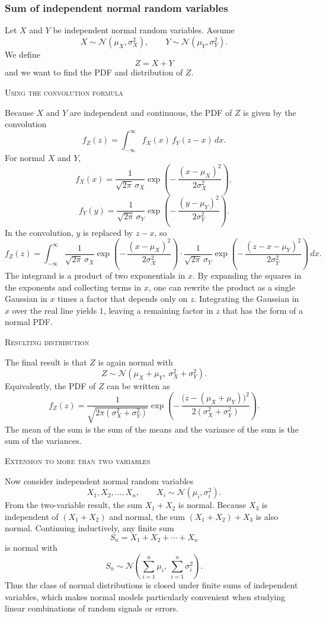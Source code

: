 \subsubsection{Sum of independent normal random variables}

Let \(X\) and \(Y\) be independent normal random variables.  
Assume
\[
X \sim \mathcal{N}(\mu_X,\sigma_X^{2}),
\qquad
Y \sim \mathcal{N}(\mu_Y,\sigma_Y^{2}).
\]
We define
\[
Z = X + Y
\]
and we want to find the PDF and distribution of \(Z\).

\bigskip
\textsc{Using the convolution formula}

Because \(X\) and \(Y\) are independent and continuous, the PDF of \(Z\) is given by the convolution
\[
f_Z(z)
=
\int_{-\infty}^{\infty} f_X(x)\,f_Y(z-x)\,dx.
\]
For normal \(X\) and \(Y\),
\[
f_X(x)
=
\frac{1}{\sqrt{2\pi}\,\sigma_X}
\exp\!\left(-\,\frac{(x-\mu_X)^{2}}{2\sigma_X^{2}}\right),
\]
\[
f_Y(y)
=
\frac{1}{\sqrt{2\pi}\,\sigma_Y}
\exp\!\left(-\,\frac{(y-\mu_Y)^{2}}{2\sigma_Y^{2}}\right).
\]
In the convolution, \(y\) is replaced by \(z-x\), so
\[
f_Z(z)
=
\int_{-\infty}^{\infty}
\frac{1}{\sqrt{2\pi}\,\sigma_X}
\exp\!\left(-\,\frac{(x-\mu_X)^{2}}{2\sigma_X^{2}}\right)
\cdot
\frac{1}{\sqrt{2\pi}\,\sigma_Y}
\exp\!\left(-\,\frac{(z-x-\mu_Y)^{2}}{2\sigma_Y^{2}}\right)
\,dx.
\]
The integrand is a product of two exponentials in \(x\).  
By expanding the squares in the exponents and collecting terms in \(x\), one can rewrite the product as a single Gaussian in \(x\) times a factor that depends only on \(z\).  
Integrating the Gaussian in \(x\) over the real line yields \(1\), leaving a remaining factor in \(z\) that has the form of a normal PDF.

\newpage
\textsc{Resulting distribution}

The final result is that \(Z\) is again normal with
\[
Z \sim \mathcal{N}(\mu_X + \mu_Y,\ \sigma_X^{2} + \sigma_Y^{2}).
\]
Equivalently, the PDF of \(Z\) can be written as
\[
f_Z(z)
=
\frac{1}{\sqrt{2\pi(\sigma_X^{2}+\sigma_Y^{2})}}
\exp\!\left(
-\,
\frac{\big(z-(\mu_X+\mu_Y)\big)^{2}}{2(\sigma_X^{2}+\sigma_Y^{2})}
\right).
\]
The mean of the sum is the sum of the means and the variance of the sum is the sum of the variances.

\bigskip
\textsc{Extension to more than two variables}

Now consider independent normal random variables
\[
X_1, X_2, \dots, X_n,
\qquad
X_i \sim \mathcal{N}(\mu_i,\sigma_i^{2}).
\]
From the two-variable result, the sum \(X_1 + X_2\) is normal.  
Because \(X_3\) is independent of \((X_1 + X_2)\) and normal, the sum \((X_1 + X_2) + X_3\) is also normal.  
Continuing inductively, any finite sum
\[
S_n = X_1 + X_2 + \cdots + X_n
\]
is normal with
\[
S_n \sim \mathcal{N}\!\left(\sum_{i=1}^{n} \mu_i,\ \sum_{i=1}^{n} \sigma_i^{2}\right).
\]
Thus the class of normal distributions is closed under finite sums of independent variables, which makes normal models particularly convenient when studying linear combinations of random signals or errors.


